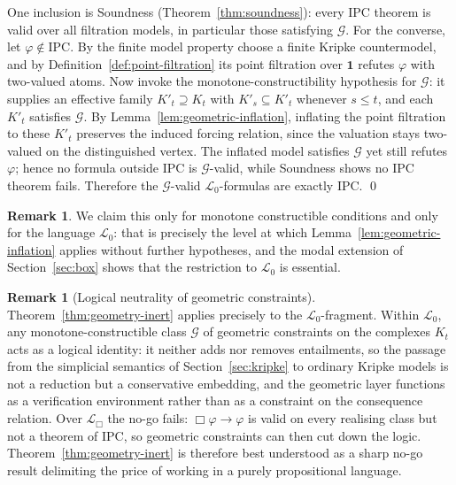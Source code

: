 \documentclass[final,12pt]{elsarticle}
\theoremstyle{plain}
\theoremstyle{definition}
\newtheorem{rem}[thm]{Remark}
\begin{document}
\proof
One inclusion is Soundness (Theorem~\ref{thm:soundness}): every IPC theorem is
valid over all filtration models, in particular those satisfying \(\mathcal G\).
For the converse, let \(\varphi \notin \mathrm{IPC}\). By the finite model property
choose a finite Kripke countermodel, and by Definition~\ref{def:point-filtration}
its point filtration over \(\mathbf 1\) refutes \(\varphi\) with two-valued atoms.
Now invoke the monotone-constructibility hypothesis for \(\mathcal G\): it supplies
an effective family \(K'_t\supseteq K_t\) with \(K'_s\subseteq K'_t\) whenever
\(s\le t\), and each \(K'_t\) satisfies \(\mathcal G\). By
Lemma~\ref{lem:geometric-inflation}, inflating the point filtration to these
\(K'_t\) preserves the induced forcing relation, since the valuation stays
two-valued on the distinguished vertex. The inflated model satisfies \(\mathcal G\)
yet still refutes \(\varphi\);
hence no formula outside IPC is \(\mathcal G\)-valid, while Soundness shows no IPC
theorem fails. Therefore the \(\mathcal G\)-valid \(\mathcal L_0\)-formulas are
exactly IPC.
\qed
\begin{rem}
\label{rem:geometry-inert-scope}
We claim this only for monotone constructible conditions and only for the
language \(\mathcal{L}_0\): that is precisely the level at which
Lemma~\ref{lem:geometric-inflation} applies without further hypotheses, and the
modal extension of Section~\ref{sec:box} shows that the restriction to
\(\mathcal{L}_0\) is essential.
\end{rem}



\begin{rem}[Logical neutrality of geometric constraints]
\label{rem:geometry-neutrality}
Theorem~\ref{thm:geometry-inert} applies precisely to the
\(\mathcal{L}_0\)-fragment.  Within \(\mathcal{L}_0\), any monotone-constructible class
\(\mathcal{G}\) of geometric constraints on the complexes \(K_t\) acts as a
logical identity: it neither adds nor removes entailments, so the passage from
the simplicial semantics of Section~\ref{sec:kripke} to ordinary Kripke models
is not a reduction but a conservative embedding, and the geometric layer
functions as a verification environment rather than as a constraint on the
consequence relation.  Over \(\mathcal{L}_\Box\) the no-go fails:
\(\Box\varphi\to\varphi\) is valid on every realising class but not a theorem
of IPC, so geometric constraints can then cut down the logic.  Theorem~\ref{thm:geometry-inert}
is therefore best understood as a sharp no-go result delimiting the price of
working in a purely propositional language.
\end{rem}
\end{document}
